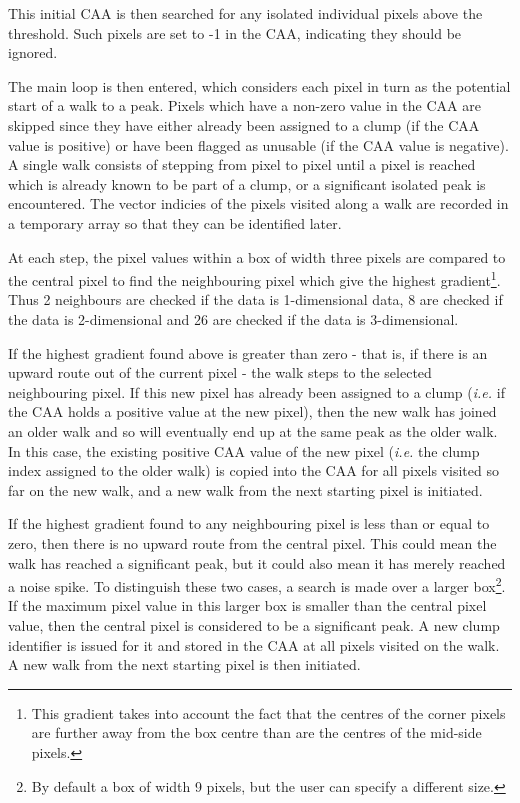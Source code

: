 \documentclass[final,authoryear,5p,times,twocolumn]{elsarticle}
\begin{document}
This initial CAA is then searched for any isolated individual pixels
above the threshold. Such pixels are set to -1 in the CAA, indicating
they should be ignored.

The main loop is then entered, which considers each pixel in turn as the
potential start of a walk to a peak. Pixels which have a non-zero value
in the CAA are skipped since they have either already been assigned to a
clump (if the CAA value is positive) or have been flagged as unusable (if
the CAA value is negative). A single walk consists of stepping from pixel
to pixel until a pixel is reached which is already known to be part of a
clump, or a significant isolated peak is encountered. The vector indicies of
the pixels visited along a walk are recorded in a temporary array so that
they  can be identified later.

At each step, the pixel values within a box of width three pixels are compared
to the central pixel to find the neighbouring pixel which give the highest
gradient\footnote{This gradient takes into account the fact that the
centres of the corner pixels are further away from the box centre than
are the centres of the mid-side pixels.}. Thus 2 neighbours are checked if
the data is 1-dimensional data, 8 are checked if the data is 2-dimensional
and 26 are checked if the data is 3-dimensional.

If the highest gradient found above is greater than zero - that is, if
there is an upward route out of the current pixel - the walk steps to the
selected neighbouring pixel. If this new pixel has already been assigned
to a clump (\emph{i.e.} if the CAA holds a positive value at the new
pixel), then the new walk has joined an older walk and so will eventually
end up at the same peak as the older walk. In this case, the existing
positive CAA value of the new pixel (\emph{i.e.} the clump index assigned
to the older walk) is copied into the CAA for all pixels visited so far
on the new walk, and a new walk from the next starting pixel is
initiated.

If the highest gradient found to any neighbouring pixel is less than or
equal to zero, then there is no upward route from the central pixel. This
could mean the walk has reached a significant peak, but it could also
mean it has merely reached a noise spike. To distinguish these two cases,
a search is made over a larger box\footnote{By default a box of width 9
pixels, but the user can specify a different size.}. If the maximum pixel
value in this larger box is smaller than the central pixel value, then
the central pixel is considered to be a significant peak. A new clump
identifier is issued for it and stored in the CAA at all pixels visited
on the walk. A new walk from the next starting pixel is then initiated.
\end{document}
